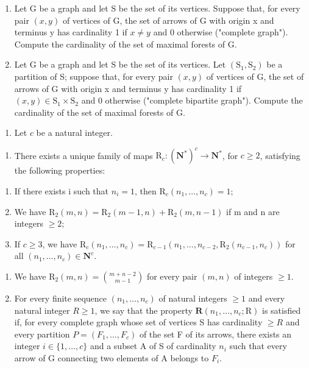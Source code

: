 \begin{enumerate}
\def\labelenumi{\alph{enumi})}
\setcounter{enumi}{1}
\item
  Let G be a graph and let S be the set of its vertices. Suppose that, for every pair \((x,y)\) of vertices of G, the set of arrows of G with origin x and terminus y has cardinality 1 if \(x \neq y\) and 0 otherwise ("complete graph"). Compute the cardinality of the set of maximal forests of G.
\item
  Let G be a graph and let S be the set of its vertices. Let \((\mathrm{S}_{1},\mathrm{S}_{2})\) be a partition of S; suppose that, for every pair \((x,y)\) of vertices of G, the set of arrows of G with origin x and terminus y has cardinality 1 if \((x,y)\in\mathrm{S}_{1}\times\mathrm{S}_{2}\) and 0 otherwise ("complete bipartite graph"). Compute the cardinality of the set of maximal forests of G.
\end{enumerate}

\begin{enumerate}
\def\labelenumi{\arabic{enumi})}
\setcounter{enumi}{5}
\tightlist
\item
  Let \(c\) be a natural integer.
\end{enumerate}

\begin{enumerate}
\def\labelenumi{\alph{enumi})}
\tightlist
\item
  There exists a unique family of maps \(\mathrm{R}_{c}\colon(\mathbf{N}^{*})^{c}\to\mathbf{N}^{*}\), for \(c\geqslant2\), satisfying the following properties:
\end{enumerate}

\begin{enumerate}
\def\labelenumi{(\roman{enumi})}
\item
  If there exists i such that \(n_{i}=1\), then \(\mathrm{R}_{c}(n_{1},\ldots,n_{c})=1\);
\item
  We have \(\mathrm{R}_{2}(m,n)=\mathrm{R}_{2}(m-1,n)+\mathrm{R}_{2}(m,n-1)\) if m and n are integers \(\geqslant2\);
\item
  If \(c \geqslant 3\), we have \(\mathrm{R}_c(n_1, \ldots, n_c) = \mathrm{R}_{c-1}(n_1, \ldots, n_{c-2}, \mathrm{R}_2(n_{c-1}, n_c))\) for all \((n_1, \ldots, n_c) \in \mathbf{N}^c\).
\end{enumerate}

\begin{enumerate}
\def\labelenumi{\alph{enumi})}
\setcounter{enumi}{1}
\item
  We have \(\mathrm{R}_2(m,n) = \binom{m + n - 2}{m - 1}\) for every pair \((m,n)\) of integers \(\geqslant 1\).
\item
  For every finite sequence \((n_{1},\ldots,n_{c})\) of natural integers \(\geqslant1\) and every natural integer \(R\geqslant1\), we say that the property \(\boldsymbol{R}(n_{1},\ldots,n_{c};\mathrm{R})\) is satisfied if, for every complete graph whose set of vertices S has cardinality \(\geqslant R\) and every partition \(P=(F_{1},\ldots,F_{c})\) of the set F of its arrows, there exists an integer \(i\in\{1,\ldots,c\}\) and a subset A of S of cardinality \(n_{i}\) such that every arrow of G connecting two elements of A belongs to \(F_{i}\).
\end{enumerate}

